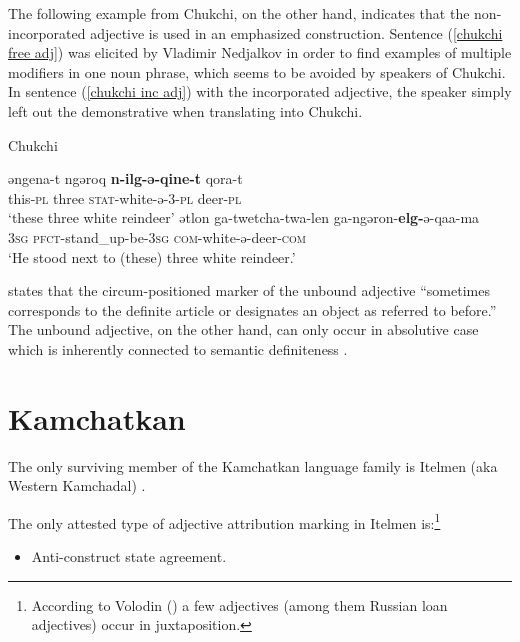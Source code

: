 The following example from Chukchi, on the other hand, indicates that the non-incorporated adjective is used in an emphasized construction. Sentence (\ref{chukchi free adj}) was elicited by Vladimir Nedjalkov \citep[cited as pc in][330]{rijkhoff2002} in order to find examples of multiple modifiers in one noun phrase, which seems to be avoided by speakers of Chukchi. In sentence (\ref{chukchi inc adj}) with the incorporated adjective, the speaker simply left out the demonstrative when translating into Chukchi.
\begin{exe}
\ex \rm{Chukchi \citep[Vladimir Nedjalkov, pc, cit.][330]{rijkhoff2002}}
\begin{xlist}
\ex \label{chukchi free adj}
\gll	əngena-t ngəroq \textbf{n-ilg-ə-qine-t} qora-t\\
	this-\textsc{pl} three \textsc{stat}-white-ə-3-\textsc{pl} deer-\textsc{pl}\\
\glt	‘these three white reindeer’
\ex \label{chukchi inc adj}
\gll	ətlon ga-twetcha-twa-len ga-ngəron-\textbf{elg-}ə-qaa-ma\\
	\textsc{3sg} \textsc{pfct}-stand\_up-be-\textsc{3sg} \textsc{com}-white-ə-deer-\textsc{com}\\
\glt	‘He stood next to (these) three white reindeer.’
\end{xlist}
\end{exe}
\citet[716]{bogoras1922} states that the circum-positioned marker of the unbound adjective “sometimes corresponds to the definite article or designates an object as referred to before.” The unbound adjective, on the other hand, can only occur in absolutive case which is inherently connected to semantic definiteness \citep[cf.][207, elsewhere]{dunn1999}.

\section{Kamchatkan}
The only surviving member of the Kamchatkan language family is Itelmen (aka Western Kamchadal) \citep[224]{salminen2007}.

The only attested type of adjective attribution marking in Itelmen is:\footnote{According to Volodin (\citeyear{volodin1997}) a few adjectives (among them Russian loan adjectives) occur in juxtaposition.}
\begin{itemize}
\item Anti-construct state agreement.
\end{itemize}

